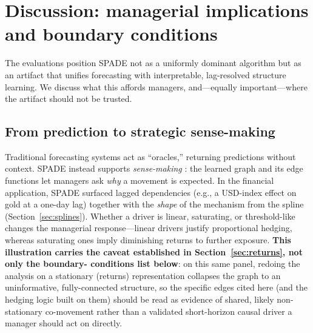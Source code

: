 
\section{Discussion: managerial implications and boundary conditions}
\label{sec:discussion}

The evaluations position SPADE not as a uniformly dominant algorithm but as an
artifact that unifies forecasting with interpretable, lag-resolved structure
learning. We discuss what this affords managers, and---equally important---where
the artifact should not be trusted.

\subsection{From prediction to strategic sense-making}
Traditional forecasting systems act as ``oracles,'' returning predictions without
context. SPADE instead supports \emph{sense-making} \citep{Weick1995}: the
learned graph and its edge functions let managers ask \emph{why} a movement is
expected. In the financial application, SPADE surfaced lagged dependencies
(e.g., a USD-index effect on gold at a one-day lag) together with the
\emph{shape} of the mechanism from the spline (Section~\ref{sec:splines}).
Whether a driver is linear, saturating, or threshold-like changes the managerial
response---linear drivers justify proportional hedging, whereas saturating ones
imply diminishing returns to further exposure. \textbf{This illustration carries
the caveat established in Section~\ref{sec:returns}, not only the boundary-
conditions list below}: on this same panel, redoing the analysis on a
stationary (returns) representation collapses the graph to an uninformative,
fully-connected structure, so the specific edges cited here (and the hedging
logic built on them) should be read as evidence of shared, likely
non-stationary co-movement rather than a validated short-horizon causal
driver a manager should act on directly.

